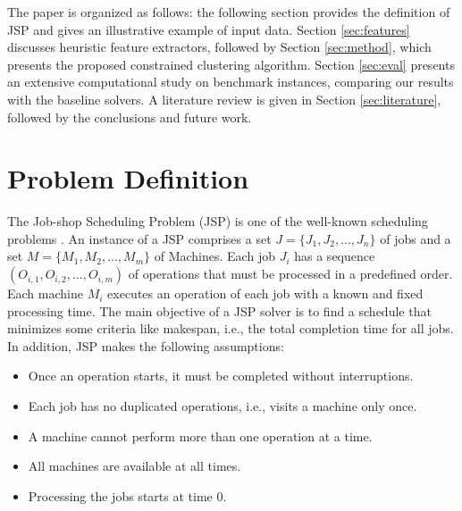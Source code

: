 \documentclass[runningheads]{llncs}
\begin{document}



The paper is organized as follows: the following section provides the definition of JSP and gives an illustrative example of input data. Section \ref{sec:features} discusses heuristic feature extractors, followed by Section \ref{sec:method}, which presents the proposed constrained clustering algorithm. Section \ref{sec:eval} presents an extensive computational study on benchmark instances, comparing our results with the baseline solvers. A literature review is given in Section \ref{sec:literature}, followed by the conclusions and future work.


\section{Problem Definition}
The Job-shop Scheduling Problem (JSP) is one of the well-known scheduling problems \cite{baker1974introduction,lenstra1979computational}. An instance of a JSP comprises a set $J = \{ J_1, J_2, \dots ,J_n \}$  of jobs and a set $M = \{ M_1, M_2, \dots ,M_m \}$ of Machines. Each job $J_i$ has a sequence $(O_{i,1}, O_{i,2}, \dots ,O_{i,m})$ of operations that must be processed in a predefined order. Each machine $M_i$ executes an operation of each job with a known and fixed processing time. The main objective of a JSP solver is to find a schedule that minimizes some criteria like makespan, i.e., the total completion time for all jobs.
In addition, JSP makes the following assumptions:
\begin{itemize}
	\item Once an operation starts, it must be completed without interruptions.
	\item Each job has no duplicated operations, i.e., visits a machine only once.
	\item A machine cannot perform more than one operation at a time.
	\item All machines are available at all times.
	\item Processing the jobs starts at time 0.
\end{itemize}
\end{document}

